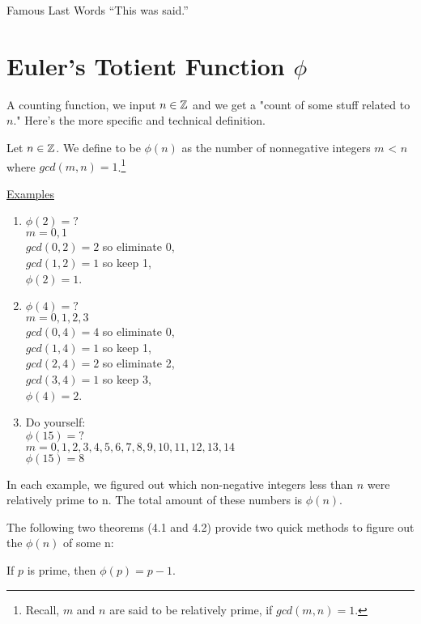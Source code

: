 \begin{chapquote}{Famous Last Words}
``This was said.''
\end{chapquote}

\section{Euler's Totient Function $\phi$}
A counting function, we input $n \in \mathbb{Z}$ and we get a "count of some stuff related to $n$."  Here's the more specific and technical definition.  

\begin{definition} Let $n \in \mathbb{Z}$.  We define  to be $\phi(n)$ as the number of nonnegative integers $m$ < $n$ where $gcd(m,n) = 1$.\footnote{Recall, $m$ and $n$ are said to be relatively prime, if $gcd(m,n) = 1$.}
\end{definition}

\underline{Examples}
\begin{enumerate}
\item $\phi(2) = ?$\\$m = 0,1$\\$gcd(0,2) = 2$ so eliminate 0,\\$gcd(1,2) = 1$ so keep 1,\\$\phi(2) = 1$.
\item $\phi(4) = ?$\\$m = 0,1,2,3$\\$gcd(0,4) = 4$ so eliminate 0,\\$gcd(1,4) = 1$ so keep 1,\\$gcd(2,4) = 2$ so eliminate 2,\\$gcd(3,4) = 1$ so keep 3,\\$\phi(4) = 2$.
\item Do yourself:\\$\phi(15) = ?$\\$m = 0,1,2,3,4,5,6,7,8,9,10,11,12,13,14$\\$\phi(15) = 8$
\end{enumerate}
In each example, we figured out which non-negative integers less than $n$ were relatively prime to n.  The total amount of these numbers is $\phi(n)$. 


\vspace{5mm}
The following two theorems (4.1 and 4.2) provide two quick methods to figure out the $\phi(n)$ of some n:

\begin{theorem}
If $p$ is prime, then $\phi(p) = p - 1$.
\end{theorem}

